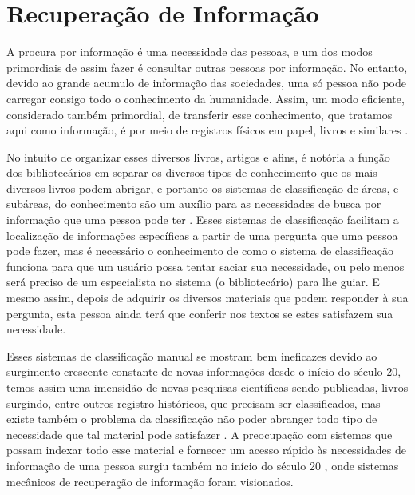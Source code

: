 \section{Recuperação de Informação} \label{sec:RecuperaçãoInformação}




A procura por informação é uma necessidade das pessoas, e um dos modos primordiais de assim fazer é consultar outras pessoas por informação.
No entanto, devido ao grande acumulo de informação das sociedades, uma só pessoa não pode carregar consigo todo o conhecimento da humanidade.
Assim, um modo eficiente, considerado também primordial, de transferir esse conhecimento, que tratamos aqui como informação, é por meio de registros físicos em papel, livros e similares \cite[p.~1]{Grossman2004IRAH}.

No intuito de organizar esses diversos livros, artigos e afins, é notória a função dos bibliotecários em separar os diversos tipos de conhecimento que os mais diversos livros podem abrigar, e portanto os sistemas de classificação de áreas, e subáreas, do conhecimento são um auxílio para as necessidades de busca por informação que uma pessoa pode ter \cite[p.~1]{Manning2008IIR} \cite[p.~1446]{Sanderson2012THIRR}. 
Esses sistemas de classificação facilitam a localização de informações específicas a partir de uma pergunta que uma pessoa pode fazer, mas é necessário o conhecimento de como o sistema de classificação funciona para que um usuário possa tentar saciar sua necessidade, ou pelo menos será preciso de um especialista no sistema (o bibliotecário) para lhe guiar.
E mesmo assim, depois de adquirir os diversos materiais que podem responder à sua pergunta, esta pessoa ainda terá que conferir nos textos se estes satisfazem sua necessidade.


Esses sistemas de classificação manual se mostram bem ineficazes devido ao surgimento crescente constante de novas informações desde o início do século 20, temos assim uma imensidão de novas pesquisas científicas sendo publicadas, livros surgindo, entre outros registro históricos, que precisam ser classificados, mas existe também o problema da classificação não poder abranger todo tipo de necessidade que tal material pode satisfazer \cite[p.~1444]{Sanderson2012THIRR}. 
A preocupação com sistemas que possam indexar todo esse material e fornecer um acesso rápido às necessidades de informação de uma pessoa surgiu também no início do século 20 \cite{Bush:1979:WMT:1113634.1113638}, onde sistemas mecânicos de recuperação de informação foram visionados.


